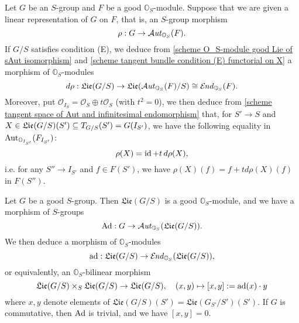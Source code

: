 Let $G$ be an $S$-group and $F$ be a good $\mathbb{O}_S$-module. Suppose that we are given a linear representation of $G$ on $F$, that is, an $S$-group morphism
\[\rho:G\to\operatorname{\mathcal{A}\hspace*{-0.2pt}\textit{ut}\hspace{0.5pt}}_{\mathbb{O}_S}(F).\]
If $G/S$ satisfies condition (E), we deduce from \cref{scheme O_S-module good Lie of sAut isomorphism} and \cref{scheme tangent bundle condition (E) functorial on X} a morphism of $\mathbb{O}_S$-modules
\[d\rho:\mathfrak{Lie}(G/S)\to\mathfrak{Lie}(\operatorname{\mathcal{A}\hspace*{-0.2pt}\textit{ut}\hspace{0.5pt}}_{\mathbb{O}_S}(F)/S)\cong\operatorname{\mathcal{E}\hspace*{-1pt}\textit{nd}\hspace{0.5pt}}_{\mathbb{O}_S}(F).\]
Moreover, put $\mathscr{O}_{I_S}=\mathscr{O}_S\oplus t\mathscr{O}_S$ (with $t^2=0$), we then deduce from \cref{scheme tangent space of Aut and infinitesimal endomorphism} that, for $S'\to S$ and $X\in\mathfrak{Lie}(G/S)(S')\subseteq T_{G/S}(S')=G(I_{S'})$, we have the following equality in $\mathrm{Aut}_{\mathbb{O}_{I_{S'}}}(F_{I_{S'}})$:
\begin{equation}\label{scheme group derived morphism of linear representation equality}
\rho(X)=\operatorname{id}+t\,d\rho(X),
\end{equation}
i.e. for any $S''\to I_{S'}$ and $f\in F(S')$, we have $\rho(X)(f)=f+td\rho(X)(f)$ in $F(S'')$.\par
Let $G$ be a good $S$-group. Then $\mathfrak{Lie}(G/S)$ is a good $\mathbb{O}_S$-module, and we have a morphism of $S$-groups
\[\mathrm{Ad}:G\to\operatorname{\mathcal{A}\hspace*{-0.2pt}\textit{ut}\hspace{0.5pt}}_{\mathbb{O}_S}(\mathfrak{Lie}(G/S)).\]
We then deduce a morphism of $\mathbb{O}_S$-modules
\[\mathrm{ad}:\mathfrak{Lie}(G/S)\to\operatorname{\mathcal{E}\hspace*{-1pt}\textit{nd}\hspace{0.5pt}}_{\mathbb{O}_S}(\mathfrak{Lie}(G/S)),\]
or equivalently, an $\mathbb{O}_S$-bilinear morphism
\[\mathfrak{Lie}(G/S)\times_S\mathfrak{Lie}(G/S)\to\mathfrak{Lie}(G/S),\quad (x,y)\mapsto [x,y]:=\mathrm{ad}(x)\cdot y\]
where $x,y$ denote elements of $\mathfrak{Lie}(G/S)(S')=\mathfrak{Lie}(G_{S'}/S')(S')$. If $G$ is commutative, then $\mathrm{Ad}$ is trivial, and we have $[x,y]=0$.

